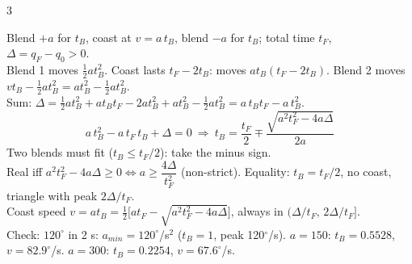 \begin{multicols}{3}
\begin{fbx}
Blend $+a$ for $t_B$, coast at $v=a\,t_B$, blend $-a$ for $t_B$; total time $t_F$, $\Delta=q_F-q_0>0$.\\
Blend 1 moves $\tfrac12at_B^2$. Coast lasts $t_F-2t_B$: moves $a t_B(t_F-2t_B)$. Blend 2 moves $vt_B-\tfrac12at_B^2=at_B^2-\tfrac12at_B^2$.\\
Sum: $\Delta=\tfrac12at_B^2+at_Bt_F-2at_B^2+at_B^2-\tfrac12at_B^2=a\,t_Bt_F-a\,t_B^2$.
\[a\,t_B^2-a\,t_F\,t_B+\Delta=0\ \Rightarrow\ t_B=\frac{t_F}2\mp\frac{\sqrt{a^2t_F^2-4a\Delta}}{2a}\]
Two blends must fit ($t_B\le t_F/2$): take the minus sign.\\
Real iff $a^2t_F^2-4a\Delta\ge0\iff a\ge\dfrac{4\Delta}{t_F^2}$ (non-strict). Equality: $t_B=t_F/2$, no coast, triangle with peak $2\Delta/t_F$.\\
Coast speed $v=at_B=\tfrac12\big[at_F-\sqrt{a^2t_F^2-4a\Delta}\big]$, always in $(\Delta/t_F,\,2\Delta/t_F]$.\\
Check: $120^\circ$ in 2 s: $a_{min}=120^\circ$/s$^2$ ($t_B=1$, peak 120$^\circ$/s). $a=150$: $t_B=0.5528$, $v=82.9^\circ$/s. $a=300$: $t_B=0.2254$, $v=67.6^\circ$/s. \chk
\end{fbx}


\end{multicols}
